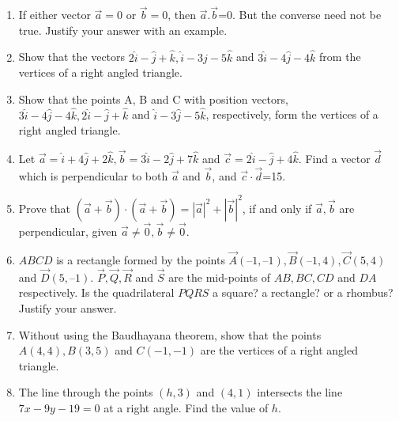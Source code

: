 \begin{enumerate}[label=\thesubsection.\arabic*,ref=\thesubsection.\theenumi]
	\\
	\solution
		
\item If either vector $\overrightarrow {a}=0$ or $\overrightarrow {b}=0$, then $\overrightarrow {a}.\overrightarrow {b}$=0. But the converse need not be true. Justify your answer with an example.
	\\
	\solution
		
\item Show that the vectors $2\hat{i}-\hat{j}+\hat{k},\hat{i}-3\hat{j}-5\hat{k}$ and  $3\hat{i}-4\hat{j}-4\hat{k}$ from the vertices of a right angled triangle.
	\\
	\solution
		
\item Show that the points A, B and C with position vectors, $3\hat{i}-4\hat{j}-4\hat{k}, 2\hat{i}-\hat{j}+\hat{k}$ and $\hat{i}-3\hat{j}-5\hat{k}$, respectively, form the vertices of a right angled
triangle.
\\
\solution
		
\item Let $\vec{a}=\hat{i}+4\hat{j}+2\hat{k}, \vec{b}=3\hat{i}-2\hat{j}+7\hat{k}$ and $\vec{c}=2\hat{i}-\hat{j}+4\hat{k}$. Find a vector $\vec{d}$ which is perpendicular to both $\vec{a}$ and $\vec{b}$, and $\vec{c}\cdot \vec{d}$=15.\\
	\solution
		
\item Prove that $(\vec{a}+\vec{b})\cdot(\vec{a}+\vec{b})=|{\vec{a}}|^2+|{\vec{b}}|^2$, if and only if $\vec{a}, \vec{b}$ are perpendicular, given $\vec{a}\neq\vec{0}, \vec{b}\neq\vec{0}$.\\
	\solution
		
\item $ABCD$ is a rectangle formed by the points $\vec{A}(–1, –1), \vec{B}(– 1, 4), \vec{C}(5, 4)$  and  $\vec{D}(5, – 1)$. $\vec{P}, \vec{Q}, \vec{R}$ and $\vec{S}$ are the mid-points of $AB, BC, CD$ and $DA$ respectively. Is the quadrilateral $PQRS$ a square? a rectangle? or a rhombus? Justify your answer.
	\\
	
\item Without using the Baudhayana theorem, show that the points $A(4,4), B(3,5)$ and $C(-1,-1)$ are the vertices of a right angled triangle.
\label{chapters/11/10/1/6}

\item The line through the points $(h, 3)$ and $(4, 1)$ intersects the line $7x- 9y- 19= 0$ at a right angle. Find the value of $h$.

\end{enumerate}
